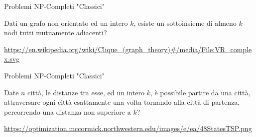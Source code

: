 \begin{frame}{Problemi NP-Completi "Classici"}

\vspace{-9pt}
\begin{myboxtitle}
Dati un grafo non orientato ed un intero $k$, esiste un sottoinsieme di almeno
$k$ nodi tutti mutuamente adiacenti?
\end{myboxtitle}


\vfill
\tiny
\url{https://en.wikipedia.org/wiki/Clique\_(graph_theory)\#/media/File:VR\_complex.svg}

\end{frame}

\begin{frame}{Problemi NP-Completi "Classici"}
	
\vspace{-9pt}
\begin{myboxtitle}
Date $n$ città, le distanze tra esse, ed un intero $k$, è possibile partire da
una città, attraversare ogni città esattamente una volta tornando alla città
di partenza, percorrendo una distanza non superiore a $k$?
\end{myboxtitle}

\begin{center}
\end{center}

\vfill
\tiny
\url{https://optimization.mccormick.northwestern.edu/images/e/ea/48StatesTSP.png}

\end{frame}



